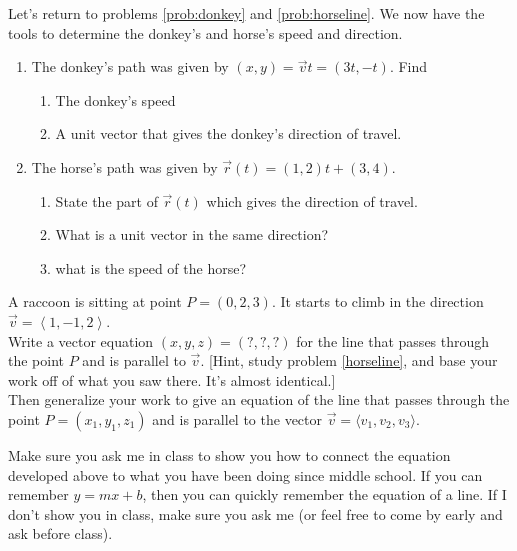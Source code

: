 \begin{problem}
Let's return to problems \ref{prob:donkey} and \ref{prob:horseline}. We now have the tools to determine the donkey's and horse's speed and direction.
\begin{enumerate} 
	\item The donkey's path was given by $(x,y)=\vec v t = (3t,-t)$. Find
	\begin{enumerate}
		\item The donkey's speed
		\item A unit vector that gives the donkey's direction of travel.
	\end{enumerate}
	\item The horse's path was given by $\vec r(t) = (1,2)t + (3,4) $.
	\begin{enumerate}
		\item State the part of $\vec r(t)$ which gives the direction of travel.
		\item What is a unit vector in the same direction?
		\item what is the speed of the horse?
	\end{enumerate}
\end{enumerate}
\end{problem}


\begin{problem}
%
A raccoon is sitting at point $P=(0,2,3)$.  It starts to climb in the direction $\vec v=\left<1,-1,2\right>$.\\
  
Write a vector equation $(x,y,z)=(?,?,?)$ for the line that passes through the point $P$ and is parallel to $\vec v$. [Hint, study problem \ref{horseline}, and base your work off of what you saw there. It's almost identical.]\\

Then generalize your work to give an equation of the line that passes through the point $P=(x_1,y_1,z_1)$ and is parallel to the vector $\vec v=\langle v_1,v_2,v_3 \rangle$. 
\end{problem}

Make sure you ask me in class to show you how to connect the equation developed above to what you have been doing since middle school. If you can remember $y=mx+b$, then you can quickly remember the equation of a line.  If I don't show you in class, make sure you ask me (or feel free to come by early and ask before class).

